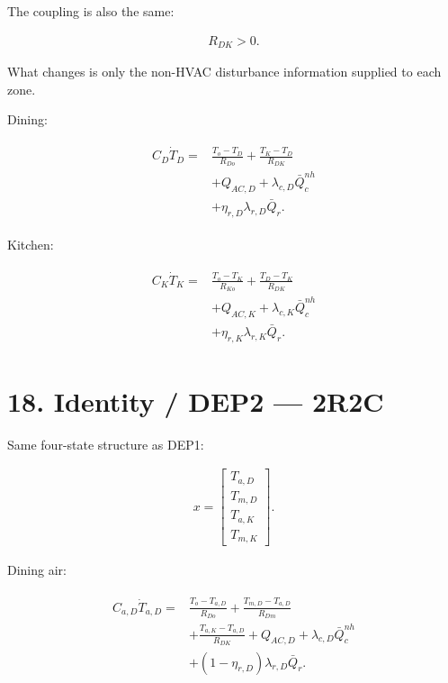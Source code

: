 \documentclass[11pt]{article}
\begin{document}
The coupling is also the same:

\begin{align}
R_{DK}>0.
\end{align}

What changes is only the non-HVAC disturbance information supplied to each zone.

Dining:

\begin{align}
\boxed{
\begin{aligned}
C_D\dot T_D
={}&
\frac{T_o-T_D}{R_{Do}}
+
\frac{T_K-T_D}{R_{DK}}\\
&+
Q_{AC,D}
+
\lambda_{c,D}\bar Q_c^{nh}\\
&+
\eta_{r,D}
\lambda_{r,D}\bar Q_r.
\end{aligned}
}
\tag{58}
\end{align}

Kitchen:

\begin{align}
\boxed{
\begin{aligned}
C_K\dot T_K
={}&
\frac{T_o-T_K}{R_{Ko}}
+
\frac{T_D-T_K}{R_{DK}}\\
&+
Q_{AC,K}
+
\lambda_{c,K}\bar Q_c^{nh}\\
&+
\eta_{r,K}
\lambda_{r,K}\bar Q_r.
\end{aligned}
}
\tag{59}
\end{align}

\section*{18. Identity / DEP2 --- 2R2C}

Same four-state structure as DEP1:

\begin{align}
x=
\begin{bmatrix}
T_{a,D}\\T_{m,D}\\T_{a,K}\\T_{m,K}
\end{bmatrix}.
\end{align}

Dining air:

\begin{align}
\boxed{
\begin{aligned}
C_{a,D}\dot T_{a,D}
={}&
\frac{T_o-T_{a,D}}{R_{Do}}
+
\frac{T_{m,D}-T_{a,D}}{R_{Dm}}\\
&+
\frac{T_{a,K}-T_{a,D}}{R_{DK}}
+
Q_{AC,D}
+
\lambda_{c,D}\bar Q_c^{nh}\\
&+
(1-\eta_{r,D})
\lambda_{r,D}\bar Q_r.
\end{aligned}
}
\tag{60}
\end{align}
\end{document}
